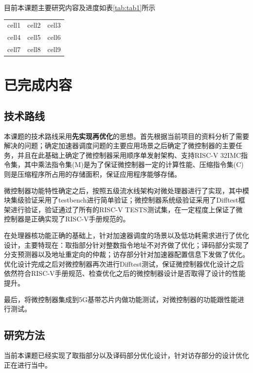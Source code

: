 \documentclass[a4paper, 12pt]{article}
\begin{document}
目前本课题主要研究内容及进度如表\ref{tab:tab1}所示
\begin{center}
\begin{tabular}{ c c c }
  \label{tab:tab1}
 cell1 & cell2 & cell3 \\ 
 cell4 & cell5 & cell6 \\  
 cell7 & cell8 & cell9    
\end{tabular}
\end{center}

\newpage
\section{已完成内容}%
\subsection{技术路线}%
本课题的技术路线采用\textbf{先实现再优化}的思想。首先根据当前项目的资料分析了需要解决的问题；确定加速器调度问题的主要应用场景之后确定了微控制器的主要任务，并且在此基础上确定了微控制器采用顺序单发射架构、支持RISC-V 32IMC指令集，其中乘法指令集(M)是为了保证微控制器一定的计算性能、压缩指令集(C)则是压缩程序所占用的存储面积，保证应用程序能够存储。

微控制器功能特性确定之后，按照五级流水线架构对微处理器进行了实现，其中模块集级验证采用了testbench进行简单验证；微控制器系统级验证采用了Difftest框架进行验证，验证通过了所有的RISC-V TESTS测试集，在一定程度上保证了微控制器是正确实现了RISC-V手册规范的。

在处理器核功能正确的基础上，针对加速器调度的场景以及低功耗需求进行了优化设计，主要特现在：取指部分针对整数指令地址不对齐做了优化；译码部分实现了分支预测器以及地址重定向的仲裁；访存部分针对加速器配置信息下发做了优化。优化设计完成之后对微控制器再次进行Difftest测试，保证微控制器优化设计之后依然符合RISC-V手册规范、检查优化之后的微控制器设计是否取得了设计的性能提升。

最后，将微控制器集成到5G基带芯片内做功能测试，对微控制器的功能跟性能进行测试。
  
\newpage
\subsection{研究方法}%
当前本课题已经实现了取指部分以及译码部分优化设计，针对访存部分的设计优化正在进行当中。
\end{document}
